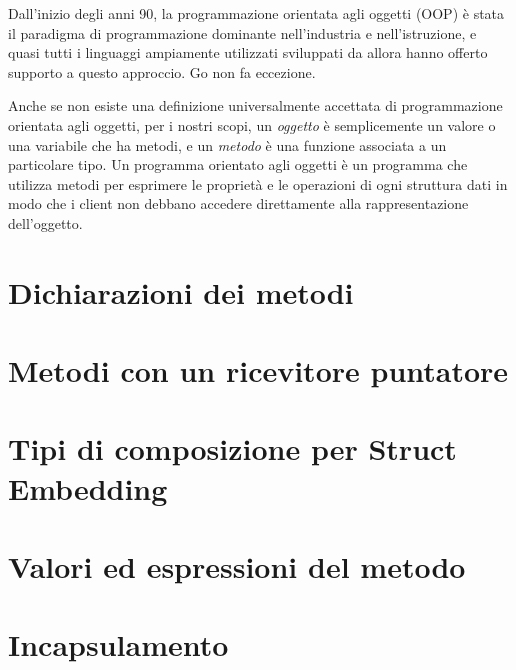 Dall'inizio degli anni 90, la programmazione orientata agli oggetti (OOP) è stata il paradigma di programmazione dominante nell'industria e nell'istruzione, e quasi tutti i linguaggi ampiamente utilizzati sviluppati da allora hanno offerto supporto a questo approccio.
Go non fa eccezione.

Anche se non esiste una definizione universalmente accettata di programmazione orientata agli oggetti, per i nostri scopi, un \textit{oggetto} è semplicemente un valore o una variabile che ha metodi, e un \textit{metodo} è una funzione associata a un particolare tipo.
Un programma orientato agli oggetti è un programma che utilizza metodi per esprimere le proprietà e le operazioni di ogni struttura dati in modo che i client non debbano accedere direttamente alla rappresentazione dell'oggetto.


\section{Dichiarazioni dei metodi}
\label{sec:dichiarazioni_dei_metodi}%



\section{Metodi con un ricevitore puntatore}
\label{sec:metodi_con_un_ricevitore_puntatore}%



\section{Tipi di composizione per Struct Embedding}
\label{sec:tipi_di_composizione_per_struct_embedding}


\section{Valori ed espressioni del metodo}
\label{sec:valori_ed_espressioni_del_metodo}%



\section{Incapsulamento}
\label{sec:incapsulamento}%


